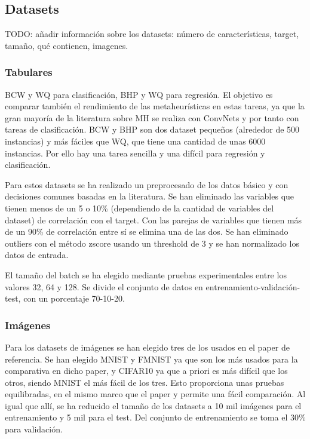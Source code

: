 \subsection{Datasets}

TODO: añadir información sobre los datasets: número de características, target, tamaño, qué contienen, imagenes.

\subsubsection{Tabulares}

BCW y WQ para clasificación, BHP y WQ para regresión. El objetivo es comparar también el rendimiento de las metaheurísticas en estas tareas, ya que la gran mayoría de la literatura sobre MH se realiza con ConvNets y por tanto con tareas de clasificación. BCW y BHP son dos dataset pequeños (alrededor de 500 instancias) y más fáciles que WQ, que tiene una cantidad de unas 6000 instancias. Por ello hay una tarea sencilla y una difícil para regresión y clasificación.

Para estos datasets se ha realizado un preprocesado de los datos básico y con decisiones comunes basadas en la literatura. Se han eliminado las variables que tienen menos de un 5 o 10\% (dependiendo de la cantidad de variables del dataset) de correlación con el target. Con las parejas de variables que tienen más de un 90\% de correlación entre sí se elimina una de las dos. Se han eliminado outliers con el método zscore usando un threshold de 3 y se han normalizado los datos de entrada.

El tamaño del batch se ha elegido mediante pruebas experimentales entre los valores 32, 64 y 128. Se divide el conjunto de datos en entrenamiento-validación-test, con un porcentaje 70-10-20.



\subsubsection{Imágenes}

Para los datasets de imágenes se han elegido tres de los usados en el paper de referencia. Se han elegido MNIST y FMNIST ya que son los más usados para la comparativa en dicho paper, y CIFAR10 ya que a priori es más difícil que los otros, siendo MNIST el más fácil de los tres. Esto proporciona unas pruebas equilibradas, en el mismo marco que el paper y permite una fácil comparación. Al igual que allí, se ha reducido el tamaño de los datasets a 10 mil imágenes para el entrenamiento y 5 mil para el test. Del conjunto de entrenamiento se toma el 30\% para validación.

